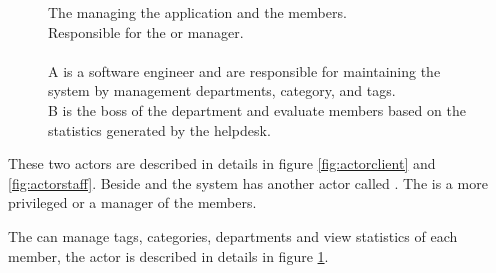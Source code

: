 \begin{figure}[h]
\begin{sadlistar}{\admin[c]}
 The \admin[] managing the application and the \staff{} members. \\
 Responsible for the \hdesk[] or \astaff[] manager. \\
\\ \admin[c] A is a software engineer and are responsible for maintaining the system by management departments, category, and tags. \\
\admin[c] B is the boss of the department and evaluate \astaff[] members based on the statistics generated by the helpdesk.
 \end{sadlistar}
 \caption{}
 \label{fig:actoradmin}
 \end{figure}


These two actors are described in details in figure \ref{fig:actorclient} and \ref{fig:actorstaff}. 
Beside \astaff{} and \aclient{} the system has another actor called \sadmin{}. 
The \sadmin{} is a more privileged \astaff{} or a manager of the \astaff members. 

The \sadmin{} can manage tags, categories, departments and view statistics of each \astaff [] member, the actor \admin[] is described in details in figure \ref{fig:actoradmin}.
